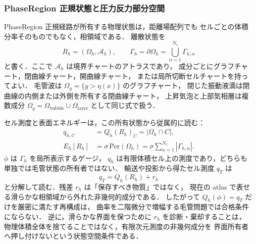 \subsubsection{PhaseRegion 正規状態と圧力反力部分空間}
\label{sec:capillary_pressure_reaction_subspace}

PhaseRegion 正規経路が所有する物理状態は，距離場配列でも
セルごとの体積分率そのものでもなく，相領域である．
離散状態を
\begin{equation}
  R_h=(\Omega_h,\mathcal{A}_h),
  \qquad
  \Gamma_h=\partial\Omega_h
  =
  \bigcup_{\alpha=1}^{N_c}\Gamma_{h,\alpha}
  \label{eq:phase_region_owner}
\end{equation}
と書く．ここで $\mathcal{A}_h$ は境界チャートのアトラスであり，
成分ごとにグラフチャート，閉曲線チャート，開曲線チャート，
または局所切断セルチャートを持ってよい．
毛管波は $\Omega_g=\{y>\eta(x)\}$ のグラフチャート，
閉じた振動液滴は閉曲線の内側または外側を所有する閉曲線チャート，
上昇気泡と上部気相層は複数成分
$\Omega_g=\Omega_{\mathrm{bubble}}\cup\Omega_{\mathrm{layer}}$
として同じ式で扱う．

セル測度と表面エネルギーは，この所有状態から従属的に読む：
\begin{align}
  q_{h,C} &= Q_h(R_h)_C
  =
  |\Omega_h\cap C|,
  \label{eq:phase_region_measure}\\
  E_h[R_h] &=
  \sigma\,\mathrm{Per}(\Omega_h)
  =
  \sigma\sum_{\alpha=1}^{N_c}|\Gamma_{h,\alpha}| .
  \label{eq:phase_region_surface_energy}
\end{align}
$\phi$ は $\Gamma_h$ を局所表示するゲージ，
$q_h$ は有限体積セル上の測度であり，どちらも単独では毛管状態の所有者ではない．
輸送や投影から得たセル測度 $q_T$ は
\begin{equation}
  q_T = Q_h(R_h)+r_h
  \label{eq:phase_region_residual_split}
\end{equation}
と分解して読む．残差 $r_h$ は「保存すべき物質」ではなく，
現在の atlas で表せる滑らかな相領域から外れた非幾何的成分である．
したがって $Q_h(\phi)=q_T$ だけを厳密に満たす再構成は，
曲率を二階微分で増幅する毛管問題では合格条件にならない．
逆に，滑らかな界面を保つために $r_h$ を診断・棄却することは，
物理体積全体を捨てることではなく，有限次元測度の非幾何成分を
界面所有者へ押し付けないという状態空間条件である．

